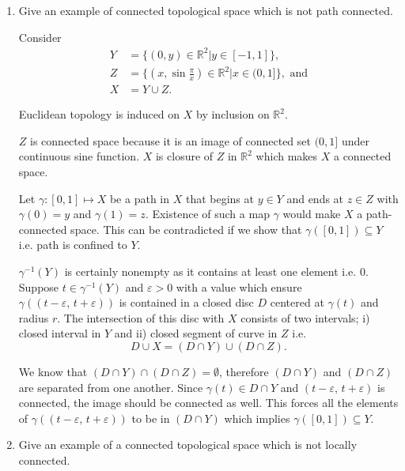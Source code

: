 \documentclass{article}
\begin{document}
\begin{enumerate}
  \item Give an example of connected topological space which is not path connected.

  \begin{ans_box}
    Consider
    \begin{equation*}
      \begin{split}
        Y&=\{(0,y)\in\mathbb{R}^{2}|y\in[-1,1]\},\\
        Z&=\{(x,\sin\frac{\pi}{x})\in\mathbb{R}^{2}|x\in(0,1]\}, \text{ and}\\
        X&=Y\cup Z.
      \end{split}
    \end{equation*}

    Euclidean topology is induced on $X$ by inclusion on $\mathbb{R}^{2}$. \medskip

    $Z$ is connected space because it is an image of connected set $(0,1]$ under continuous sine function. $X$ is closure of $Z$ in $\mathbb{R}^{2}$ which makes $X$ a connected space. \medskip

    Let $\gamma:[0,1]\mapsto X$ be a path in $X$ that begins at $y\in Y$ and ends at $z\in Z$ with $\gamma(0)=y$ and $\gamma(1)=z$. Existence of such a map $\gamma$ would make $X$ a path-connected space. This can be contradicted if we show that $\gamma([0,1])\subseteq Y$ i.e. path is confined to $Y$.\medskip

    $\gamma^{-1}(Y)$ is certainly nonempty as it contains at least one element i.e. $0$. Suppose $t\in\gamma^{-1}(Y)$ and $\varepsilon>0$ with a value which ensure $\gamma\left((t-\varepsilon,\,t+\varepsilon)\right)$ is contained in a closed disc $D$ centered at $\gamma(t)$ and radius $r$. The intersection of this disc with $X$ consists of two intervals; i) closed interval in $Y$ and ii) closed segment of curve in $Z$ i.e. $$D\cup X=(D\cap Y)\cup(D\cap Z).$$

    We know that $(D\cap Y)\cap(D\cap Z)=\emptyset$, therefore $(D\cap Y)$ and $(D\cap Z)$ are separated from one another. Since $\gamma(t)\in D\cap Y$ and $(t-\varepsilon,\,t+\varepsilon)$ is connected, the image should be connected as well. This forces all the elements of $\gamma\left((t-\varepsilon,\,t+\varepsilon)\right)$ to be in $(D\cap Y)$ which implies $\gamma([0,1])\subseteq Y$.
  \end{ans_box}

\item  Give an example of a connected topological space which is not locally connected.


\end{enumerate}
\end{document}
